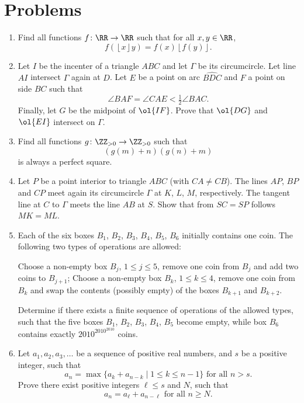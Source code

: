 \documentclass[11pt]{scrartcl}
\begin{document}
\section{Problems}
\begin{enumerate}[\bfseries 1.]
\item %
Find all functions $f \colon \RR \to \RR$ such that for all $x,y \in \RR$,
\[ f(\left\lfloor x\right\rfloor y) = f(x)\left\lfloor f(y)\right\rfloor. \]

\item %
Let $I$ be the incenter of a triangle $ABC$ and let $\Gamma$ be its circumcircle.
Let line $AI$ intersect $\Gamma$ again at $D$.
Let $E$ be a point on arc $\widehat{BDC}$ and $F$ a point on side $BC$ such that
\[ \angle BAF = \angle CAE < \tfrac12 \angle BAC. \]
Finally, let $G$ be the midpoint of $\ol{IF}$.
Prove that $\ol{DG}$ and $\ol{EI}$ intersect on $\Gamma$.

\item %
Find all functions $g \colon \ZZ_{>0} \to \ZZ_{>0}$ such that
\[ \left( g(m)+n \right)\left( g(n)+m \right) \]
is always a perfect square.

\item %
Let $P$ be a point interior to triangle $ABC$ (with $CA \neq CB$).
The lines $AP$, $BP$ and $CP$ meet again its circumcircle $\Gamma$
at $K$, $L$, $M$, respectively.
The tangent line at $C$ to $\Gamma$ meets the line $AB$ at $S$.
Show that from $SC = SP$ follows $MK = ML$.

\item %
Each of the six boxes $B_1$, $B_2$, $B_3$, $B_4$, $B_5$, $B_6$
initially contains one coin.
The following two types of operations are allowed:
\begin{enumerate}
  \ii Choose a non-empty box $B_j$, $1\leq j \leq 5$,
  remove one coin from $B_j$ and add two coins to $B_{j+1}$;
  \ii Choose a non-empty box $B_k$, $1\leq k \leq 4$,
  remove one coin from $B_k$ and swap the contents
  (possibly empty) of the boxes $B_{k+1}$ and $B_{k+2}$.
\end{enumerate}
Determine if there exists a finite sequence of operations of the allowed types,
such that the five boxes $B_1$, $B_2$, $B_3$, $B_4$, $B_5$ become empty,
while box $B_6$ contains exactly $2010^{2010^{2010}}$ coins.

\item %
Let $a_1, a_2, a_3, \dots$ be a sequence of positive real numbers, and $s$ be a positive integer, such that
\[
  a_n =
  \max \{ a_k + a_{n-k} \mid 1 \leq k \leq n-1 \}
  \text{ for all $n > s$}.
\]
Prove there exist positive integers $\ell \leq s$ and $N$, such that
\[
  a_n =
  a_{\ell} + a_{n - \ell} \text{ for all $n \ge N$}.
\]

\end{enumerate}
\pagebreak
\end{document}
